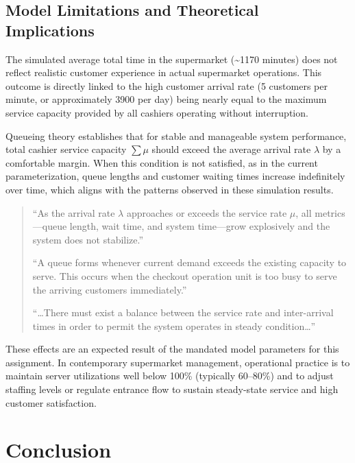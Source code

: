 \documentclass[
]{article}
\begin{document}
\newpage
\justifying

\subsection{Model Limitations and Theoretical
Implications}\label{model-limitations-and-theoretical-implications}

The simulated average total time in the supermarket (\textasciitilde1170
minutes) does not reflect realistic customer experience in actual
supermarket operations. This outcome is directly linked to the high
customer arrival rate (5 customers per minute, or approximately 3900 per
day) being nearly equal to the maximum service capacity provided by all
cashiers operating without interruption.

Queueing theory establishes that for stable and manageable system
performance, total cashier service capacity \(\sum\mu\) should exceed
the average arrival rate \(\lambda\) by a comfortable margin. When this
condition is not satisfied, as in the current parameterization, queue
lengths and customer waiting times increase indefinitely over time,
which aligns with the patterns observed in these simulation results.

\begin{quote}
``As the arrival rate \(\lambda\) approaches or exceeds the service rate
\(\mu\), all metrics---queue length, wait time, and system time---grow
explosively and the system does not stabilize.''

``A queue forms whenever current demand exceeds the existing capacity to
serve. This occurs when the checkout operation unit is too busy to serve
the arriving customers immediately.''

``\ldots There must exist a balance between the service rate and
inter-arrival times in order to permit the system operates in steady
condition\ldots{}''
\end{quote}

These effects are an expected result of the mandated model parameters
for this assignment. In contemporary supermarket management, operational
practice is to maintain server utilizations well below 100\% (typically
60--80\%) and to adjust staffing levels or regulate entrance flow to
sustain steady-state service and high customer satisfaction.

\newpage
\centering

\section{Conclusion}\label{conclusion}
\end{document}
